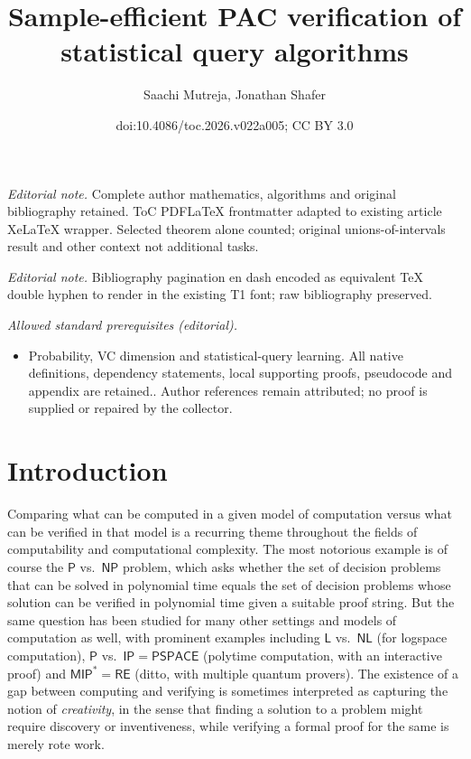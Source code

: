 \documentclass[11pt]{article}
\title{Sample-efficient PAC verification of statistical query algorithms}
\author{Saachi Mutreja, Jonathan Shafer}
\date{doi:10.4086/toc.2026.v022a005; CC BY 3.0}
\begin{document}
\maketitle
\noindent\textit{Editorial note.} Complete author mathematics, algorithms and original bibliography retained. ToC PDFLaTeX frontmatter adapted to existing article XeLaTeX wrapper. Selected theorem alone counted; original unions-of-intervals result and other context not additional tasks.\par\medskip
\noindent\textit{Editorial note.} Bibliography pagination en dash encoded as equivalent TeX double hyphen to render in the existing T1 font; raw bibliography preserved.\par\medskip
\noindent\textit{Allowed standard prerequisites (editorial).}\begin{itemize}
\item Probability, VC dimension and statistical-query learning. All native definitions, dependency statements, local supporting proofs, pseudocode and appendix are retained.. Author references remain attributed; no proof is supplied or repaired by the collector.
\end{itemize}\medskip
\section{Introduction}

Comparing what can be computed in a given model of computation versus what can be verified in that model is a recurring theme throughout the fields of computability and computational complexity. The most notorious example is of course the $\mathsf{P}$ vs.\ $\mathsf{NP}$ problem, which asks whether the set of decision problems that can be solved in polynomial time equals the set of decision problems whose solution can be verified in polynomial time given a suitable proof string. But the same question has been studied for many other settings and models of computation as well, with prominent examples including $\mathsf{L}$ vs.\ $\mathsf{NL}$ (for logspace computation), $\mathsf{P}$ vs.\ $\mathsf{IP} = \mathsf{PSPACE}$ (polytime computation, with an interactive proof) and $\mathsf{MIP}^* = \mathsf{RE}$ (ditto, with multiple quantum provers). The existence of a gap between computing and verifying is sometimes interpreted as capturing the notion of \emph{creativity}, in the sense that finding a solution to a problem might require discovery or inventiveness, while verifying a formal proof for the same is merely rote work.
\end{document}
